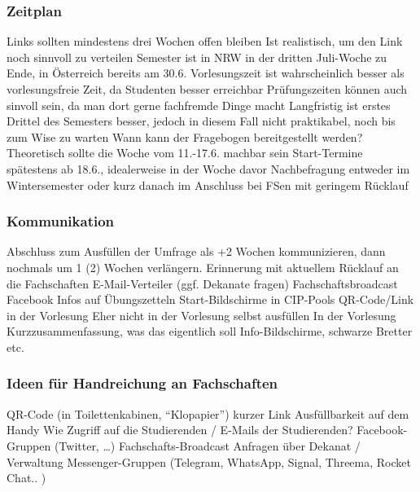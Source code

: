       \subsubsection*{Zeitplan}
        \begin{outline}
          \1 Links sollten mindestens drei Wochen offen bleiben
          \1 Ist realistisch, um den Link noch sinnvoll zu verteilen
          \1 Semester ist in NRW in der dritten Juli-Woche zu Ende, in Österreich bereits am 30.6.
          \1 Vorlesungszeit ist wahrscheinlich besser als vorlesungsfreie Zeit, da Studenten besser erreichbar
          \1 Prüfungszeiten können auch sinvoll sein, da man dort gerne fachfremde Dinge macht
          \1 Langfristig ist erstes Drittel des Semesters besser, jedoch in diesem Fall nicht praktikabel, noch bis zum Wise zu warten
          \1 Wann kann der Fragebogen bereitgestellt werden?
            \2 Theoretisch sollte die Woche vom 11.-17.6. machbar sein
          \1 Start-Termine
            \2 spätestens ab 18.6., idealerweise in der Woche davor
          \1 Nachbefragung entweder im Wintersemester oder kurz danach im Anschluss bei FSen mit geringem Rücklauf
        \end{outline}

      \subsubsection*{Kommunikation}
        \begin{outline}
          \1 Abschluss zum Ausfüllen der Umfrage als +2 Wochen kommunizieren, dann nochmals um 1 (2) Wochen verlängern.
          \1 Erinnerung mit aktuellem Rücklauf an die Fachschaften
          \1 E-Mail-Verteiler (ggf. Dekanate fragen)
          \1 Fachschaftsbroadcast
          \1 Facebook
          \1 Infos auf Übungszetteln
          \1 Start-Bildschirme in CIP-Pools
          \1 QR-Code/Link in der Vorlesung
            \2 Eher nicht in der Vorlesung selbst ausfüllen
            \2 In der Vorlesung Kurzzusammenfassung, was das eigentlich soll
          \1 Info-Bildschirme, schwarze Bretter etc.
        \end{outline}

      \subsubsection*{Ideen für Handreichung an Fachschaften}
        \begin{outline}
          \1 QR-Code (in Toilettenkabinen, “Klopapier”)
          \1 kurzer Link
          \1 Ausfüllbarkeit auf dem Handy
          \1 Wie Zugriff auf die Studierenden / E-Mails der Studierenden?
            \2 Facebook-Gruppen (Twitter, …)
            \2 Fachschafts-Broadcast
            \2 Anfragen über Dekanat / Verwaltung
            \2 Messenger-Gruppen (Telegram, WhatsApp, Signal, Threema, Rocket Chat.. )
        \end{outline}


